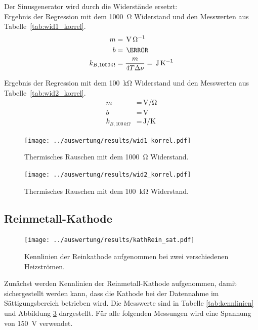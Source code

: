 Der Sinusgenerator wird durch die Widerstände ersetzt:\\
Ergebnis der Regression mit dem \SI{1000}{\ohm} Widerstand und den Messwerten aus \mbox{Tabelle \ref{tab:wid1_korrel}}.
\begin{align*}
m &= \,\si{\volt\per\ohm}\\
b &= \,\volt\\
k_{B,1000\,\Omega} &= \frac{m}{4T\Delta\nu} =\,\si{\joule\per\kelvin}\\
\end{align*}

Ergebnis der Regression mit dem \SI{100}{\kilo\ohm} Widerstand und den Messwerten aus \mbox{Tabelle \ref{tab:wid2_korrel}}.
\begin{align*}
m &= \,\si{\volt\per\ohm}\\
b &= \,\si{\volt}\\
k_{B,100\,k\Omega} &= \,\si{\joule\per\kelvin}
\end{align*}

\begin{figure}[htbp]
	\texttt{[image: ../auswertung/results/wid1\_korrel.pdf]}
	\caption{Thermisches Rauschen mit dem \SI{1000}{\ohm} Widerstand.}
	\label{fig:thermRauschen1}
\end{figure}

\begin{figure}[htbp]
	\texttt{[image: ../auswertung/results/wid2\_korrel.pdf]}
	\caption{Thermisches Rauschen mit dem \SI{100}{\kilo\ohm} Widerstand.}
	\label{fig:thermRauschen2}
\end{figure}

\subsection{Reinmetall-Kathode}
\begin{figure}[htbp]
	\texttt{[image: ../auswertung/results/kathRein\_sat.pdf]}
	\caption{Kennlinien der Reinkathode aufgenommen bei zwei verschiedenen Heizströmen.}
	\label{fig:kennlinie}
\end{figure}
Zunächst werden Kennlinien der Reinmetall-Kathode aufgenommen, damit sichergestellt werden kann, dass die Kathode bei der Datennahme im Sättigungsbereich betrieben wird. Die Messwerte sind in Tabelle \ref{tab:kennlinien} und Abbildung \ref{fig:kennlinie} dargestellt. Für alle folgenden Messungen wird eine Spannung von \SI{150}{\volt} verwendet.

